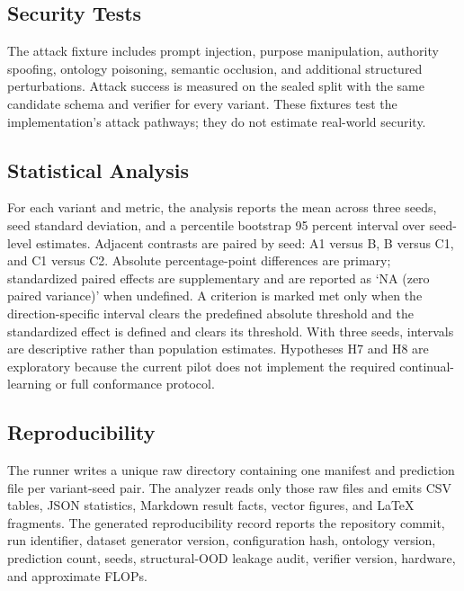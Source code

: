 \subsection{Security Tests}

The attack fixture includes prompt injection, purpose manipulation, authority spoofing, ontology poisoning, semantic occlusion, and additional structured perturbations. Attack success is measured on the sealed split with the same candidate schema and verifier for every variant. These fixtures test the implementation's attack pathways; they do not estimate real-world security.

\subsection{Statistical Analysis}

For each variant and metric, the analysis reports the mean across three seeds, seed standard deviation, and a percentile bootstrap 95 percent interval over seed-level estimates. Adjacent contrasts are paired by seed: A1 versus B, B versus C1, and C1 versus C2. Absolute percentage-point differences are primary; standardized paired effects are supplementary and are reported as `NA (zero paired variance)' when undefined. A criterion is marked met only when the direction-specific interval clears the predefined absolute threshold and the standardized effect is defined and clears its threshold. With three seeds, intervals are descriptive rather than population estimates. Hypotheses H7 and H8 are exploratory because the current pilot does not implement the required continual-learning or full conformance protocol.

\subsection{Reproducibility}

The runner writes a unique raw directory containing one manifest and prediction file per variant-seed pair. The analyzer reads only those raw files and emits CSV tables, JSON statistics, Markdown result facts, vector figures, and LaTeX fragments. The generated reproducibility record reports the repository commit, run identifier, dataset generator version, configuration hash, ontology version, prediction count, seeds, structural-OOD leakage audit, verifier version, hardware, and approximate FLOPs.

